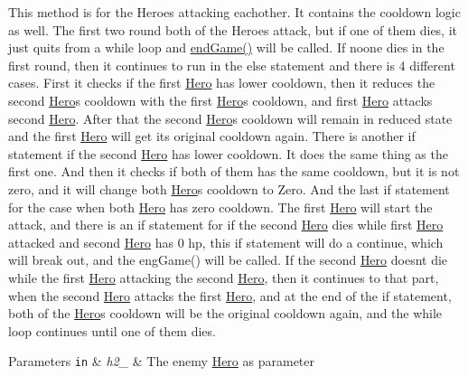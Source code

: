 This method is for the Heroes attacking eachother. It contains the cooldown logic as well. The first two round both of the Heroes attack, but if one of them dies, it just quits from a while loop and \hyperlink{classHero_a56e321690e3545aeb4fab9d3181d27e9}{end\+Game()} will be called. If noone dies in the first round, then it continues to run in the else statement and there is 4 different cases. First it checks if the first \hyperlink{classHero}{Hero} has lower cooldown, then it reduces the second \hyperlink{classHero}{Hero}\textquotesingle{}s cooldown with the first \hyperlink{classHero}{Hero}\textquotesingle{}s cooldown, and first \hyperlink{classHero}{Hero} attacks second \hyperlink{classHero}{Hero}. After that the second \hyperlink{classHero}{Hero}\textquotesingle{}s cooldown will remain in reduced state and the first \hyperlink{classHero}{Hero} will get its original cooldown again. There is another if statement if the second \hyperlink{classHero}{Hero} has lower cooldown. It does the same thing as the first one. And then it checks if both of them has the same cooldown, but it is not zero, and it will change both \hyperlink{classHero}{Hero}\textquotesingle{}s cooldown to Zero. And the last if statement for the case when both \hyperlink{classHero}{Hero} has zero cooldown. The first \hyperlink{classHero}{Hero} will start the attack, and there is an if statement for if the second \hyperlink{classHero}{Hero} dies while first \hyperlink{classHero}{Hero} attacked and second \hyperlink{classHero}{Hero} has 0 hp, this if statement will do a continue, which will break out, and the eng\+Game() will be called. If the second \hyperlink{classHero}{Hero} doesn\textquotesingle{}t die while the first \hyperlink{classHero}{Hero} attacking the second \hyperlink{classHero}{Hero}, then it continues to that part, when the second \hyperlink{classHero}{Hero} attacks the first \hyperlink{classHero}{Hero}, and at the end of the if statement, both of the \hyperlink{classHero}{Hero}\textquotesingle{}s cooldown will be the original cooldown again, and the while loop continues until one of them dies. 


\begin{DoxyParams}[1]{Parameters}
\mbox{\tt in}  & {\em h2\+\_\+} & The enemy \hyperlink{classHero}{Hero} as parameter \\
\hline
\end{DoxyParams}
\mbox{\label{classHero_a56e321690e3545aeb4fab9d3181d27e9}} 
